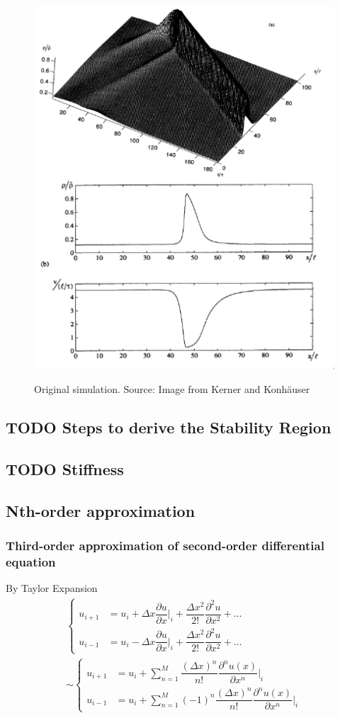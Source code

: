\documentclass[12pt]{article}
\begin{document}
\begin{figure}[!htb]
  \centering
  \caption{\label{fig:sim2} Original simulation. Source: Image from Kerner and Konhäuser \cite{kerner1993}}
  \includegraphics[width=0.4\linewidth]{./resources/kerner.png}
  \\  %
\end{figure}
\subsection{{\bfseries\sffamily TODO} Steps to derive the Stability Region}
\label{sec:org15fb6e0}
\subsection{{\bfseries\sffamily TODO} Stiffness}
\label{sec:orgfbdd1ef}
\subsection{Nth-order approximation}
\label{sec:orga0598aa}
\subsubsection{Third-order approximation of second-order differential equation}
\label{sec:org8357717}

By Taylor Expansion
\begin{equation}
\begin{aligned}
\begin{cases}
u_{i+1} &= u_{i} + \Delta{x}\dfrac{\partial{u}}{\partial{x}}\biggr\rvert_i + \dfrac{\Delta{x^2}}{2!}\dfrac{\partial^2{u}}{\partial{x^2}} + \ldots \\
u_{i-1} &= u_{i} - \Delta{x}\dfrac{\partial{u}}{\partial{x}}\biggr\rvert_i + \dfrac{\Delta{x^2}}{2!}\dfrac{\partial^2{u}}{\partial{x^2}} + \ldots
\end{cases}\\
\sim
\begin{cases}
u_{i+1} &= u_{i} + \sum_{n=1}^{M}{\dfrac{(\Delta{x})^n}{n!}\dfrac{\partial^n{u(x)}}{\partial{x^n}}\biggr\rvert_i}\\
u_{i-1} &= u_{i} + \sum_{n=1}^{M}{(-1)^n\dfrac{(\Delta{x})^n}{n!}\dfrac{\partial^n{u(x)}}{\partial{x^n}}\biggr\rvert_i}
\end{cases}
\end{aligned}
\end{equation}
\end{document}
